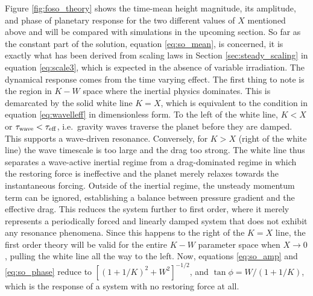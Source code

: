 \documentclass[trackchanges,twocolumn]{aastex7}
\begin{document}
Figure \ref{fig:foso_theory} shows the time-mean height magnitude, its amplitude, and phase of planetary response for the two different values of $X$ mentioned above and will be compared with simulations in the upcoming section. So far as the constant part of the solution, equation \eqref{eq:so_mean}, is concerned, it is exactly what has been derived from scaling laws in Section \ref{sec:steady_scaling} in equation \eqref{eq:scale3}, which is expected in the absence of variable irradiation. The dynamical response comes from the time varying effect. The first thing to note is the region in $K-W$ space where the inertial physics dominates. This is demarcated by the solid white line $K=X$, which is equivalent to the condition in equation \eqref{eq:wavelleff} in dimensionless form. To the left of the white line, $K < X$ or $\tau_{\rm wave} < \tau_{\rm eff}$, i.e.\ gravity waves traverse the planet before they are damped. This supports a wave-driven resonance. Conversely, for $K > X$ (right of the white line) the wave timescale is too large and the drag too strong. The white line thus separates a wave-active inertial regime from a drag-dominated regime in which the restoring force is ineffective and the planet merely relaxes towards the instantaneous forcing. Outside of the inertial regime, the unsteady momentum term can be ignored, establishing a balance between pressure gradient and the effective drag. This reduces the system further to first order, where it merely represents a periodically forced and linearly damped system that does not exhibit any resonance phenomena. Since this happens to the right of the $K=X$ line, the first order theory will be valid for the entire $K-W$ parameter space when $X \to 0$, pulling the white line all the way to the left. Now, equations \eqref{eq:so_amp} and \eqref{eq:so_phase} reduce to $\left[(1+1/K)^2 + W^2\right]^{-1/2}$, and $\tan\phi = W/(1+1/K)$, which is the response of a system with no restoring force at all.

\end{document}
